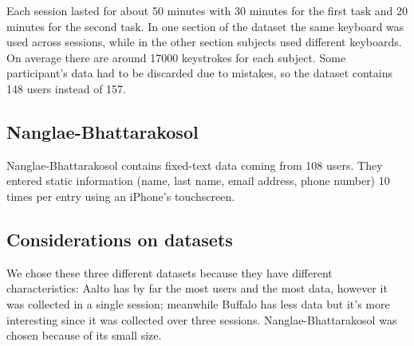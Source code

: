 Each session lasted for about 50 minutes with 30 minutes for the first task and 20 minutes for the second task. In one section of the dataset the same keyboard was used across sessions, while in the other section subjects used different keyboards. On average there are around 17000 keystrokes for each subject. Some participant's data had to be discarded due to mistakes, so the dataset contains 148 users instead of 157.\\

\subsection{Nanglae-Bhattarakosol}

Nanglae-Bhattarakosol \cite{ref:nanglae} contains fixed-text data coming from 108 users. They entered static information (name, last name, email address, phone number) 10 times per entry using an iPhone's touchscreen.\\

\subsection{Considerations on datasets}
We chose these three different datasets because they have different characteristics: Aalto has by far the most users and the most data, however it was collected in a single session; meanwhile Buffalo has less data but it's more interesting since it was collected over three sessions. Nanglae-Bhattarakosol was chosen because of its small size.